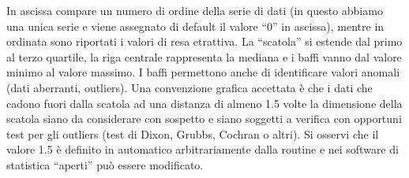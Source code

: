 \documentclass[
  11pt,
]{book}
\begin{document}
In ascissa compare un numero di ordine della serie di dati (in questo abbiamo una unica serie e viene assegnato di default il valore ``0'' in ascissa), mentre in ordinata sono riportati i valori di resa etrattiva. La ``scatola'' si estende dal primo al terzo quartile, la riga centrale rappresenta la mediana e i baffi vanno dal valore minimo al valore massimo. I baffi permettono anche di identificare valori anomali (dati aberranti, outliers). Una convenzione grafica accettata è che i dati che cadono fuori dalla scatola ad una distanza di almeno 1.5 volte la dimensione della scatola siano da considerare con sospetto e siano soggetti a verifica con opportuni test per gli outliers (test di Dixon, Grubbs, Cochran o altri).
Si osservi che il valore 1.5 è definito in automatico arbitrariamente dalla routine e nei software di statistica ``aperti'' può essere modificato.

\backmatter

  

\end{document}
